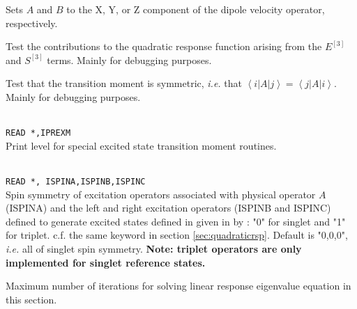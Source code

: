 \begin{description}
\item{}
Sets $A$ and $B$ to the X, Y, or Z component of the dipole velocity
operator, respectively.

\item{}
Test the contributions to the quadratic response function arising from
the $E^{\left[3\right]}$ and $S^{\left[3\right]}$ terms.  Mainly for
debugging purposes.

\item{}
Test that the transition moment is symmetric, {\it i.e.\/} that
$\left<i\left|A\right|j\right> =
\left<j\left|A\right|i\right>$. Mainly for debugging purposes.

\item{}\\
\verb|READ *,IPREXM|\\
Print level for special excited state transition moment routines.

\item{}\\
\verb|READ *, ISPINA,ISPINB,ISPINC|\\
Spin symmetry of excitation operators associated with physical operator $A$ (ISPINA)
and the left and right excitation operators (ISPINB and ISPINC) defined to 
generate excited states defined in  given in by :
"0" for singlet and "1" for triplet.
c.f. the same keyword in section \ref{sec:quadraticrsp}.
Default is "0,0,0", {\it i.e.\/} all of singlet spin symmetry.
{\bf Note: triplet operators are only implemented for singlet reference states.}


\item{}
Maximum number of iterations for solving linear response
eigenvalue equation in this section.


\end{description}
